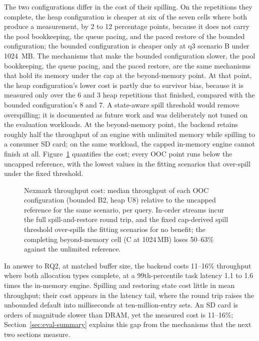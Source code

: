 The two configurations differ in the cost of their spilling.
On the repetitions they complete, the heap configuration is cheaper at six of the seven cells where both produce a measurement, by 2 to 12 percentage points, because it does not carry the pool bookkeeping, the queue pacing, and the paced restore of the bounded configuration; the bounded configuration is cheaper only at q3 scenario B under 1024\, MB.
The mechanisms that make the bounded configuration slower, the pool bookkeeping, the queue pacing, and the paced restore, are the same mechanisms that hold its memory under the cap at the beyond-memory point.
At that point, the heap configuration's lower cost is partly due to survivor bias, because it is measured only over the 6 and 3 heap repetitions that finished, compared with the bounded configuration's 8 and 7.
A state-aware spill threshold would remove overspilling; it is documented as future work and was deliberately not tuned on the evaluation workloads.
At the beyond-memory point, the backend retains roughly half the throughput of an engine with unlimited memory while spilling to a consumer SD card; on the same workload, the capped in-memory engine cannot finish at all.
Figure~\ref{fig:nexmark-cost} quantifies the cost; every \ac{OOC} point runs below the uncapped reference, with the lowest values in the fitting scenarios that over-spill under the fixed threshold.

\begin{figure}[htbp]
\centering
{}
\caption[Nexmark throughput cost]{Nexmark throughput cost: median throughput of
each \ac{OOC} configuration (bounded B2, heap U8) relative to the uncapped reference
for the same scenario, per query. In-order streams incur the full spill-and-restore
round trip, and the fixed cap-derived spill threshold over-spills the fitting
scenarios for no benefit; the completing beyond-memory cell (C at 1024\,MB) loses
50--63\% against the unlimited reference.\nexmarknote}
\label{fig:nexmark-cost}
\end{figure}

In answer to RQ2, at matched buffer size, the backend costs 11--16\% throughput where both allocation types complete, at a 99th-percentile task latency 1.1 to 1.6 times the in-memory engine.
Spilling and restoring state cost little in mean throughput; their cost appears in the latency tail, where the round trip raises the unbounded default into milliseconds at ten-million-entry sets.
An SD card is orders of magnitude slower than DRAM, yet the measured cost is 11--16\%; Section~\ref{sec:eval-summary} explains this gap from the mechanisms that the next two sections measure.

